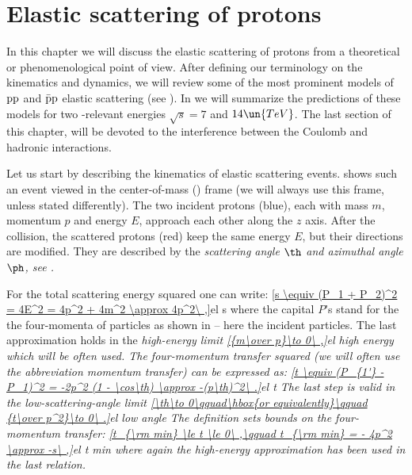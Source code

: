 \def\FC{F^{\rm C}}
\def\FH{F^{\rm H}}
\def\FCH{F^{\rm C+H}}

\def\KL{Kundr\' at-Lokaj\char237\char232 ek}
\def\KaL{Kundr\' at and Lokaj\char237\char232 ek}
\def\WY{West-Yennie}
\def\WaY{West and Yennie}

\def\formula#1{%
	$$\hbox to\hsize{\hskip1cm\it #1\hss}$$
	\vskip-5mm
}


\chapter[el]{Elastic scattering of protons}

In this chapter we will discuss the elastic scattering of protons from a theoretical or phenomenological point of view. After defining our terminology on the kinematics and dynamics, we will review some of the most prominent models of $\rm pp$ and $\rm\bar pp$ elastic scattering (see ). In  we will summarize the predictions of these models for two -relevant energies $\sqrt s = 7$ and $14\un{TeV}$. The last section of this chapter,  will be devoted to the interference between the Coulomb and hadronic interactions.

Let us start by describing the kinematics of elastic scattering events.  shows such an event viewed in the center-of-mass () frame (we will always use this frame, unless stated differently). The two incident protons (blue), each with mass $m$, momentum $p$ and energy $E$, approach each other along the $z$ axis. After the collision, the scattered protons (red) keep the same energy $E$, but their directions are modified. They are described by the \em{scattering angle} $\th$ and \em{azimuthal angle} $\ph$, see .


For the total scattering energy squared one can write:
\eqref{s \equiv (P_1 + P_2)^2 = 4E^2 = 4p^2 + 4m^2 \approx 4p^2\ ,}{el s}
where the capital $P$'s stand for the the four-momenta of particles as shown in  -- here the incident particles. The last approximation holds in the \em{high-energy} limit
\eqref{{m\over p}\to 0\ ,}{el high energy}
which will be often used. The four-momentum transfer squared (we will often use the abbreviation momentum transfer) can be expressed as:
\eqref{t \equiv (P_{1'} - P_1)^2 = -2p^2 (1 - \cos\th) \approx -(p\th)^2\ .}{el t}
The last step is valid in the \em{low-scattering-angle} limit
\eqref{\th\to 0\qquad\hbox{or equivalently}\qquad {t\over p^2}\to 0\ .}{el low angle}
The definition  sets bounds on the four-momentum transfer:
\eqref{t_{\rm min} \le t \le 0\ ,\qquad t_{\rm min} = - 4p^2 \approx -s\ ,}{el t min}
where again the high-energy approximation has been used in the last relation.

